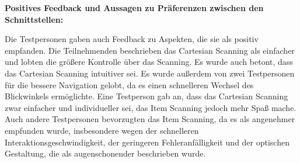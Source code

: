 \textbf{Positives Feedback und Aussagen zu Präferenzen zwischen den Schnittstellen:}

Die Testpersonen gaben auch Feedback zu Aspekten, die sie als positiv empfanden. Die Teilnehmenden beschrieben das Cartesian Scanning als einfacher und lobten die größere Kontrolle über das Scanning. Es wurde auch betont, dass das Cartesian Scanning intuitiver sei. Es wurde außerdem von zwei Testpersonen für die bessere Navigation gelobt, da es einen schnelleren Wechsel des Blickwinkels ermöglichte. Eine Testperson gab an, dass das Cartesian Scanning zwar einfacher und individueller sei, das Item Scanning jedoch mehr Spaß mache. Auch andere Testpersonen bevorzugten das Item Scanning, da es als angenehmer empfunden wurde, insbesondere wegen der schnelleren Interaktionsgeschwindigkeit, der geringeren Fehleranfälligkeit und der optischen Gestaltung, die als augenschonender beschrieben wurde. 


